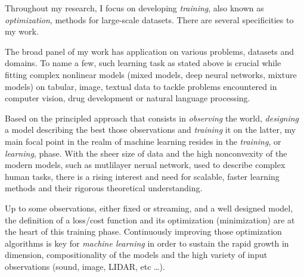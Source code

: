 \documentclass[twoside,11pt]{article}
\begin{document}
%
%
%
%
%
%
%


\textbf{}  \hfill \textbf{} 

 \hfill {}

\hfill

Throughout my research, I focus on developing \emph{training}, also known as \emph{optimization}, methods for large-scale datasets.
There are several specificities to my work.

The broad panel of my work has application on various problems, datasets and domains.
To name a few, such learning task as stated above is crucial while fitting complex nonlinear models (mixed models, deep neural networks, mixture models) on tabular, image, textual data to tackle problems encountered in computer vision, drug development or natural language processing.

Based on the principled approach that consists in \emph{observing} the world, \emph{designing} a model describing the best those observations and \emph{training} it on the latter, my main focal point in the realm of machine learning resides in the \emph{training}, or \emph{learning}, phase.
With the sheer size of data and the high nonconvexity of the modern models, such as mutlilayer nerual network, used to describe complex human tasks, there is a rising interest and need for scalable, faster learning methods and their rigorous theoretical understanding.

Up to some observations, either fixed or streaming, and a well designed model, the definition of a loss/cost function and its optimization (minimization) are at the heart of this training phase.
Continuously improving those optimization algorithms is key for \emph{machine learning} in order to sustain the rapid growth in dimension, compositionality of the models and the high variety of input observations (sound, image, LIDAR, etc \dots).
\end{document}
